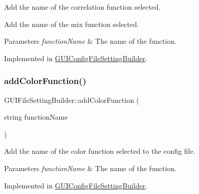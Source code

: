 Add the name of the correlation function selected. 

Add the name of the mix function selected.


\begin{DoxyParams}{Parameters}
{\em function\+Name} & The name of the function. \\
\hline
\end{DoxyParams}


Implemented in \mbox{\hyperlink{class_g_u_i_config_file_setting_builder_a66c807146e8d76be96b8ad2c5088779f}{G\+U\+I\+Config\+File\+Setting\+Builder}}.

\mbox{\label{class_g_u_i_file_setting_builder_a640a258d617394edf010da3feaf80e11}} 
\subsubsection{\texorpdfstring{add\+Color\+Function()}{addColorFunction()}}
{\footnotesize\ttfamily G\+U\+I\+File\+Setting\+Builder\+::add\+Color\+Function (\begin{DoxyParamCaption}\item[{string}]{function\+Name }\end{DoxyParamCaption})\hspace{0.3cm}{\ttfamily [pure virtual]}}



Add the name of the color function selected to the config file. 


\begin{DoxyParams}{Parameters}
{\em function\+Name} & The name of the function. \\
\hline
\end{DoxyParams}


Implemented in \mbox{\hyperlink{class_g_u_i_config_file_setting_builder_a5275c0c1258a3088674bc1ef009e1ea3}{G\+U\+I\+Config\+File\+Setting\+Builder}}.

\mbox{\label{class_g_u_i_file_setting_builder_aac6a7c5d7d56144ad40e9dcacb4b17d6}} 
